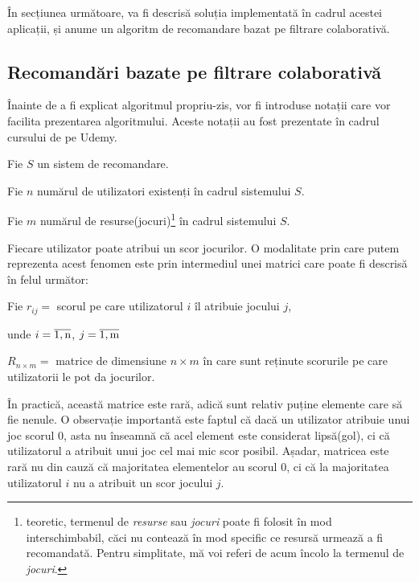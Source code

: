 \documentclass[12pt,a4paper]{report}
\begin{document}
În secțiunea următoare, va fi descrisă soluția implementată în cadrul acestei aplicații, și anume un algoritm de recomandare bazat pe filtrare colaborativă.

\subsection{Recomandări bazate pe filtrare colaborativă}


   Înainte de a fi explicat algoritmul propriu-zis, vor fi introduse notații care vor facilita prezentarea algoritmului. Aceste notații au fost prezentate în cadrul cursului de pe Udemy.

\bigskip
\bigskip

Fie \( S \) un sistem de recomandare.

Fie \( n \) numărul de utilizatori existenți în cadrul sistemului \(S \).

Fie \( m \) numărul de resurse(jocuri)\footnote{teoretic, termenul de \emph{resurse} sau \emph{jocuri} poate fi folosit în mod interschimbabil, căci nu contează în mod specific ce resursă urmează a fi recomandată. Pentru simplitate, mă voi referi de acum încolo la termenul de \emph{jocuri}.}
 în cadrul sistemului \( S \).

\bigskip
\bigskip

\noindent Fiecare utilizator poate atribui un scor jocurilor. O modalitate prin care putem reprezenta acest fenomen este prin intermediul unei matrici care poate fi descrisă în felul următor:

\bigskip
\bigskip

Fie \( r_{ij} =  \) scorul pe care utilizatorul \( i \) îl atribuie jocului \( j \),

unde \( i = \overline{\rm 1,n} \), \( j = \overline{\rm 1,m} \)

\( R_{n \times m} = \) matrice de dimensiune \( n \times m\) în care sunt reținute scorurile pe care utilizatorii le pot da jocurilor.

\bigskip
\bigskip


\noindent În practică, această matrice este rară, adică sunt relativ puține elemente care să fie nenule. O observație importantă este faptul că dacă un utilizator atribuie unui joc scorul 0, asta nu înseamnă că acel element este considerat lipsă(gol), ci că utilizatorul a atribuit unui joc cel mai mic scor posibil. Așadar, matricea este rară nu din cauză că majoritatea elementelor au scorul 0, ci că la majoritatea utilizatorul \( i \) nu a atribuit un scor jocului \( j \).
\end{document}
